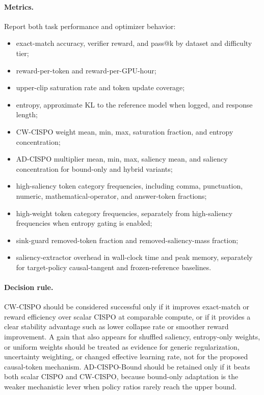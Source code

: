\documentclass[11pt]{article}
\begin{document}
\paragraph{Metrics.}
Report both task performance and optimizer behavior:
\begin{itemize}[leftmargin=*]
  \item exact-match accuracy, verifier reward, and pass@k by dataset and
  difficulty tier;
  \item reward-per-token and reward-per-GPU-hour;
  \item upper-clip saturation rate and token update coverage;
  \item entropy, approximate KL to the reference model when logged, and
  response length;
  \item CW-CISPO weight mean, min, max, saturation fraction, and entropy
  concentration;
  \item AD-CISPO multiplier mean, min, max, saliency mean, and saliency
  concentration for bound-only and hybrid variants;
  \item high-saliency token category frequencies, including comma,
  punctuation, numeric, mathematical-operator, and answer-token fractions;
  \item high-weight token category frequencies, separately from high-saliency
  frequencies when entropy gating is enabled;
  \item sink-guard removed-token fraction and removed-saliency-mass fraction;
  \item saliency-extractor overhead in wall-clock time and peak memory,
  separately for target-policy causal-tangent and frozen-reference baselines.
\end{itemize}

\paragraph{Decision rule.}
CW-CISPO should be considered successful only if it improves exact-match or
reward efficiency over scalar CISPO at comparable compute, or if it provides a
clear stability advantage such as lower collapse rate or smoother reward
improvement. A gain that also appears for shuffled saliency, entropy-only
weights, or uniform weights should be treated as evidence for generic
regularization, uncertainty weighting, or changed effective learning rate, not
for the proposed causal-token mechanism. AD-CISPO-Bound should be retained only
if it beats both scalar CISPO and CW-CISPO, because bound-only adaptation is the
weaker mechanistic lever when policy ratios rarely reach the upper bound.
\end{document}
